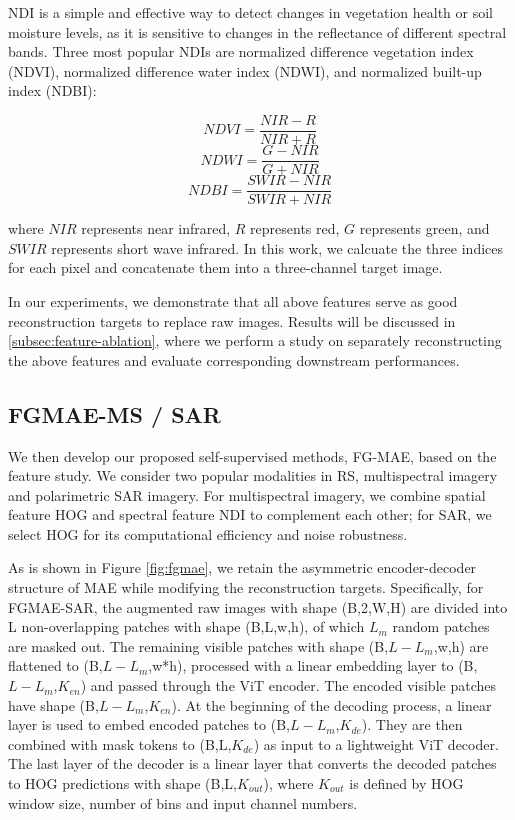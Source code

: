 \documentclass[lettersize,journal]{IEEEtran}
\begin{document}
NDI is a simple and effective way to detect changes in vegetation health or soil moisture levels, as it is sensitive to changes in the reflectance of different spectral bands. Three most popular NDIs are normalized difference vegetation index (NDVI), normalized difference water index (NDWI), and normalized built-up index (NDBI):

\begin{equation}
    NDVI = \frac{NIR-R}{NIR+R}
\end{equation}
\begin{equation}
    NDWI = \frac{G-NIR}{G+NIR}
\end{equation}
\begin{equation}
    NDBI = \frac{SWIR-NIR}{SWIR+NIR}
\end{equation}

\noindent where $NIR$ represents near infrared, $R$ represents red, $G$ represents green, and $SWIR$ represents short wave infrared. In this work, we calcuate the three indices for each pixel and concatenate them into a three-channel target image.

\vspace{0.5em}
In our experiments, we demonstrate that all above features serve as good reconstruction targets to replace raw images. Results will be discussed in \ref{subsec:feature-ablation}, where we perform a study on separately reconstructing the above features and evaluate corresponding downstream performances.

\subsection{FGMAE-MS / SAR}
\label{subsec:fgmae}

We then develop our proposed self-supervised methods, FG-MAE, based on the feature study. We consider two popular modalities in RS, multispectral imagery and polarimetric SAR imagery. For multispectral imagery, we combine spatial feature HOG and spectral feature NDI to complement each other; for SAR, we select HOG for its computational efficiency and noise robustness. 

As is shown in Figure \ref{fig:fgmae}, we retain the asymmetric encoder-decoder structure of MAE while modifying the reconstruction targets. Specifically, for FGMAE-SAR, the augmented raw images with shape (B,2,W,H) are divided into L non-overlapping patches with shape (B,L,w,h), of which $L_{m}$ random patches are masked out. The remaining visible patches with shape (B,$L-L_{m}$,w,h) are flattened to (B,$L-L_{m}$,w*h), processed with a linear embedding layer to (B,$L-L_{m}$,$K_{en}$) and passed through the ViT encoder. The encoded visible patches have shape (B,$L-L_{m}$,$K_{en}$). At the beginning of the decoding process, a linear layer is used to embed encoded patches to (B,$L-L_{m}$,$K_{de}$). They are then combined with mask tokens to (B,L,$K_{de}$) as input to a lightweight ViT decoder. The last layer of the decoder is a linear layer that converts the decoded patches to HOG predictions with shape (B,L,$K_{out}$), where $K_{out}$ is defined by HOG window size, number of bins and input channel numbers. 
\end{document}
